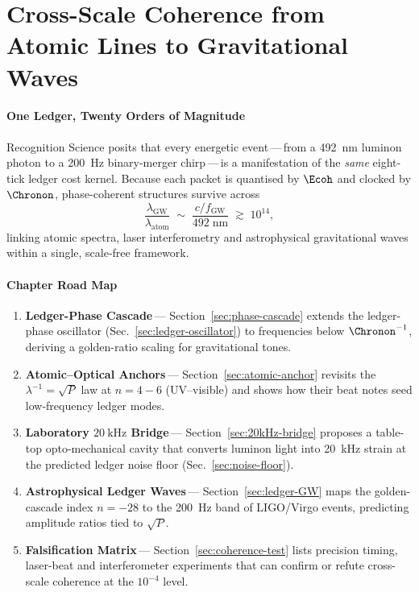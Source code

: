 \documentclass[11pt,oneside]{book}
\begin{document}
{\section{Cross-Scale Coherence from Atomic Lines to Gravitational Waves}
\label{sec:cross-scale}

\paragraph{One Ledger, Twenty Orders of Magnitude}

Recognition Science posits that every energetic event\,—\,from a
\SI{492}{\nano\metre} luminon photon to a \SI{200}{\hertz}
binary-merger chirp\,—\,is a manifestation of the \emph{same}
eight-tick ledger cost kernel.
Because each packet is quantised by
\(\Ecoh\) and clocked by \(\Chronon\),
phase-coherent structures survive across
\[
   \frac{\lambda_{\mathrm{GW}}}{\lambda_{\mathrm{atom}}}
   \;\sim\;
   \frac{c/f_{\mathrm{GW}}}{492\;\text{nm}}
   \;\gtrsim\;
   10^{14},
\]
linking atomic spectra, laser interferometry and astrophysical
gravitational waves within a single, scale-free framework.

\paragraph{Chapter Road Map}

\begin{enumerate}\setlength\itemsep{4pt}
\item \textbf{Ledger-Phase Cascade}\,—
      Section~\ref{sec:phase-cascade} extends the
      ledger-phase oscillator (Sec.~\ref{sec:ledger-oscillator})
      to frequencies below \(\Chronon^{-1}\),
      deriving a golden-ratio scaling for gravitational tones.
\item \textbf{Atomic–Optical Anchors}\,—
      Section~\ref{sec:atomic-anchor} revisits the
      $\lambda^{-1}\!=\!\sqrt{P}$ law
      at $n=4\!-\!6$ (UV–visible) and shows how their
      beat notes seed low-frequency ledger modes.
\item \textbf{Laboratory  $\SI{20}{\kilo\hertz}$ Bridge}\,—
      Section~\ref{sec:20kHz-bridge} proposes a table-top
      opto-mechanical cavity that converts luminon light into
      \SI{20}{\kilo\hertz} strain at the
      predicted ledger noise floor (Sec.~\ref{sec:noise-floor}).
\item \textbf{Astrophysical Ledger Waves}\,—
      Section~\ref{sec:ledger-GW}
      maps the golden-cascade index $n=-28$ to the
      \SI{200}{\hertz} band of LIGO/Virgo events,
      predicting amplitude ratios tied to \(\sqrt{P}\).
\item \textbf{Falsification Matrix}\,—
      Section~\ref{sec:coherence-test} lists precision
      timing, laser-beat and interferometer experiments that can
      confirm or refute cross-scale coherence at the
      \(10^{-4}\) level.
\end{enumerate}

}
\end{document}

